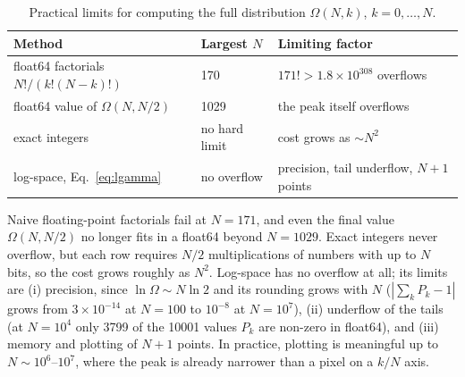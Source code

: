 \documentclass[11pt,a4paper]{article}
\begin{document}
\begin{table}[H]
  \centering
  \small
  \begin{tabular}{lll}
    \toprule
    Method & Largest $N$ & Limiting factor \\
    \midrule
    float64 factorials $N!/(k!(N-k)!)$ & 170 & $171!>1.8\times10^{308}$ overflows \\
    float64 value of $\Omega(N,N/2)$ & 1029 & the peak itself overflows \\
    exact integers & no hard limit & cost grows as $\sim N^2$ \\
    log-space, Eq.~\eqref{eq:lgamma} & no overflow & precision, tail underflow, $N+1$ points \\
    \bottomrule
  \end{tabular}
  \caption{Practical limits for computing the full distribution $\Omega(N,k)$, $k=0,\dots,N$.}
  \label{tab:limits}
\end{table}

Naive floating-point factorials fail at $N=171$, and even the final value $\Omega(N,N/2)$ no
longer fits in a float64 beyond $N=1029$. Exact integers never overflow, but each row requires
$N/2$ multiplications of numbers with up to $N$ bits, so the cost grows roughly as $N^2$.
Log-space has no overflow at all; its limits are (i) precision, since $\ln\Omega\sim N\ln2$
and its rounding grows with $N$ ($|\sum_k P_k-1|$ grows from $3\times10^{-14}$ at $N=100$ to
$10^{-8}$ at $N=10^7$), (ii) underflow of the tails (at $N=10^4$ only 3799 of the 10001 values
$P_k$ are non-zero in float64), and (iii) memory and plotting of $N+1$ points. In practice,
plotting is meaningful up to $N\sim10^{6}$--$10^{7}$, where the peak is already narrower than
a pixel on a $k/N$ axis.
\end{document}

